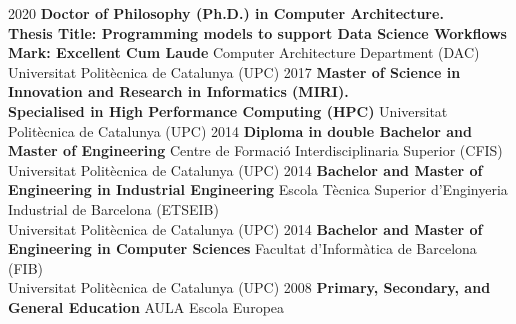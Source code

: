 %
%
%


\vspace{0.3em}

\begin{scholarship}
    \scholarshipentry
        {2020}
        {\textbf{Doctor of Philosophy (Ph.D.) in Computer Architecture.} \\ \textbf{Thesis Title: Programming models to support Data Science Workflows} \\ \textbf{Mark: Excellent Cum Laude}}
        {Computer Architecture Department (DAC) \\ Universitat Politècnica de Catalunya (UPC)}
    \scholarshipentry
        {2017}
        {\textbf{Master of Science in Innovation and Research in Informatics (MIRI).} \\ \textbf{Specialised in High Performance Computing (HPC)}}
        {Universitat Politècnica de Catalunya (UPC)}
    \scholarshipentry
        {2014}
        {\textbf{Diploma in double Bachelor and Master of Engineering}}
        {Centre de Formació Interdisciplinaria Superior (CFIS) \\ Universitat Politècnica de Catalunya (UPC)}
    \scholarshipentry
        {2014}
        {\textbf{Bachelor and Master of Engineering in Industrial Engineering}}
        {Escola Tècnica Superior d'Enginyeria Industrial de Barcelona (ETSEIB) \\ Universitat Politècnica de Catalunya (UPC)}
    \scholarshipentry
        {2014}
        {\textbf{Bachelor and Master of Engineering in Computer Sciences}}
        {Facultat d'Informàtica de Barcelona (FIB) \\ Universitat Politècnica de Catalunya (UPC)}
    \scholarshipentry
        {2008}
        {\textbf{Primary, Secondary, and General Education}}
        {AULA Escola Europea}
\end{scholarship}

\vspace{-0.3em}